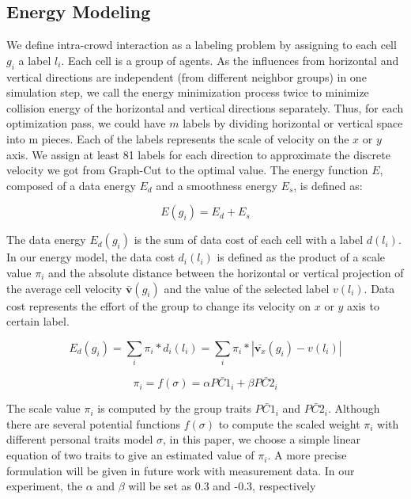 \documentclass[conference]{acmsiggraph}
\begin{document}
\subsection{Energy Modeling}
\label{section:4.1}
We define intra-crowd interaction as a labeling problem by assigning to each cell $g_i$ a label $l_i$. Each cell is a group of agents. As the influences from horizontal and vertical directions are independent (from different neighbor groups) in one simulation step, we call the energy minimization process twice to minimize collision energy of the horizontal and vertical directions separately. Thus, for each optimization pass, we could have $m$ labels by dividing horizontal or vertical space into m pieces. Each of the labels represents the scale of velocity on the $x$ or $y$ axis. We assign at least 81 labels for each direction to approximate the discrete velocity we got from Graph-Cut to the optimal value. The energy function $E$, composed of a data energy $E_d$ and a smoothness energy $E_s$, is defined as:

\begin{equation}
\label{eq:7}
E(g_i) = E_d + E_s
\end{equation}

The data energy $E_{d}(g_i)$ is the sum of data cost of each cell with a label $d(l_i)$. In our energy model, the data cost $d_{i}(l_i)$ is defined as the product of a scale value $\pi_i$ and the absolute distance between the horizontal or vertical projection of the average cell velocity $\bar{\textbf{v}}(g_i)$ and the value of the selected label $v(l_i)$. Data cost represents the effort of the group to change its velocity on $x$ or $y$ axis to certain label.

\begin{equation}
\label{eq:8}
E_{d}(g_i) = \sum_{i}\pi_i*d_i(l_i) = \sum_{i}\pi_i*|\bar{\textbf{v}_x}(g_i) - v(l_i)|
\end{equation}

\begin{equation}
\label{eq:9}
\pi_i = f(\sigma ) = \alpha\bar{{PC1}_i} + \beta\bar{{PC2}_i}
\end{equation}

The scale value $\pi_i$ is computed by the group traits $\bar{{PC1}_i}$ and $\bar{{PC2}_i}$. Although there are several potential functions $f(\sigma)$ to compute the scaled weight $\pi_i$ with different personal traits model $\sigma$,
in this paper, we choose a simple linear equation of two traits to give an estimated value of $\pi_i$. A more precise formulation will be given in future work with measurement data. In our experiment, the $\alpha$ and $\beta$ will be set as 0.3 and -0.3, respectively
\end{document}
